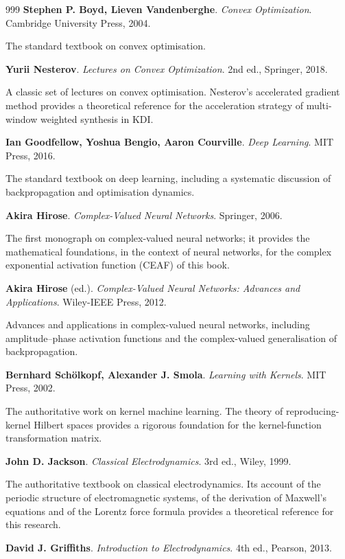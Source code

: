 \begin{thebibliography}{999}
 \textbf{Stephen P. Boyd, Lieven Vandenberghe}. \textit{Convex Optimization}. Cambridge University Press, 2004.

The standard textbook on convex optimisation.

 \textbf{Yurii Nesterov}. \textit{Lectures on Convex Optimization}. 2nd ed., Springer, 2018.

A classic set of lectures on convex optimisation. Nesterov's accelerated gradient method provides a theoretical reference for the acceleration strategy of multi-window weighted synthesis in KDI.

 \textbf{Ian Goodfellow, Yoshua Bengio, Aaron Courville}. \textit{Deep Learning}. MIT Press, 2016.

The standard textbook on deep learning, including a systematic discussion of backpropagation and optimisation dynamics.

 \textbf{Akira Hirose}. \textit{Complex-Valued Neural Networks}. Springer, 2006.

The first monograph on complex-valued neural networks; it provides the mathematical foundations, in the context of neural networks, for the complex exponential activation function (CEAF) of this book.

 \textbf{Akira Hirose} (ed.). \textit{Complex-Valued Neural Networks: Advances and Applications}. Wiley-IEEE Press, 2012.

Advances and applications in complex-valued neural networks, including amplitude--phase activation functions and the complex-valued generalisation of backpropagation.

 \textbf{Bernhard Sch\"olkopf, Alexander J. Smola}. \textit{Learning with Kernels}. MIT Press, 2002.

The authoritative work on kernel machine learning. The theory of reproducing-kernel Hilbert spaces provides a rigorous foundation for the kernel-function transformation matrix.

 \textbf{John D. Jackson}. \textit{Classical Electrodynamics}. 3rd ed., Wiley, 1999.

The authoritative textbook on classical electrodynamics. Its account of the periodic structure of electromagnetic systems, of the derivation of Maxwell's equations and of the Lorentz force formula provides a theoretical reference for this research.

 \textbf{David J. Griffiths}. \textit{Introduction to Electrodynamics}. 4th ed., Pearson, 2013.


\end{thebibliography}

